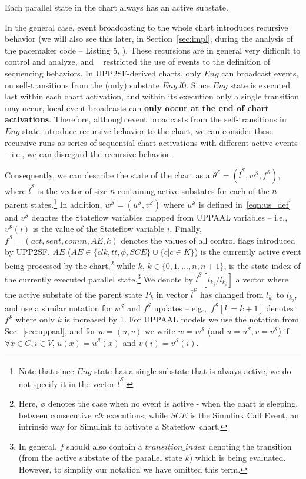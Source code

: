 \begin{proposition}
\label{p1_noinactivechild}
Each parallel state in the chart always has an active substate.
\end{proposition}

In the general case, event broadcasting to the whole chart introduces recursive behavior (we will also see this later, in Section~\ref{sec:impl}, during the analysis of the pacemaker code -- Listing 5, ). These recursions are in general very difficult to control and analyze, and ~\cite{SFsem1} restricted the use of events to the definition of sequencing behaviors. 
In UPP2SF-derived charts, only $Eng$ can broadcast events, on self-transitions from the (only) substate $Eng.l0$. Since $Eng$ state is executed last within each chart activation, and within its execution only a single transition may occur, local event broadcasts can \textbf{only occur at the end of chart activations}. Therefore, although event broadcasts from the self-transitions in $Eng$ state introduce recursive behavior to the chart, we can consider these recursive runs as series of sequential chart activations with different active events -- i.e., we can disregard the recursive behavior. 


Consequently, we can describe the state of the chart as a $\theta^\mathcal{S}=(\bar{l}^\mathcal{S},w^\mathcal{S},f^\mathcal{S})$, where $\bar{l}^\mathcal{S}$ is the vector of size $n$ containing active substates for each of the $n$ parent states.\footnote{Note that since $Eng$ state has a single substate that is always active, we do not specify it in the vector $\bar{l}^\mathcal{S}$.} 
In addition, $w^\mathcal{S}=(u^\mathcal{S},v^\mathcal{S})$ where $u^\mathcal{S}$ is defined in~\eqref{eqn:us_def} and $v^\mathcal{S}$ denotes the Stateflow variables mapped from UPPAAL variables -- i.e., $v^\mathcal{S}(i)$ is the value of the Stateflow variable $i$. Finally, $f^\mathcal{S}=(act,sent,comm,AE,k)$ denotes the values of all control flags introduced by UPP2SF. $AE$ ($AE\in\{clk,tt,\phi, SCE\}\cup\{c|c\in K\}$) is the currently active event being processed by the chart,\footnote{Here, $\phi$ denotes the case when no event is active - when the chart is sleeping, between consecutive 
\textit{clk} executions, while $SCE$ is the Simulink Call Event, an intrinsic way for Simulink to activate a Stateflow~chart.} while $k$, $k\in\{0,1,...,n,n+1\}$, is the state index of the currently executed parallel state.\footnote{In general, $f$ should also contain a $transition\_index$ denoting the transition (from the active substate of the parallel state $k$) which is being evaluated. However, to simplify our notation we have omitted this term.} 
We denote by $\bar{l}^\mathcal{S}[l_{k_j}/l_{k_i}]$ a vector where the active substate of the parent state $P_k$ in vector $\bar{l}^\mathcal{S}$ has changed from $l_{k_i}$ to $l_{k_j}$, and use a similar notation for $w^\mathcal{S}$ and $f^\mathcal{S}$ updates -- e.g.,~$f^\mathcal{S}[k=k+1]$ denotes $f^\mathcal{S}$ where only $k$ is increased by 1. 
For  UPPAAL models we use the notation from Sec.~\ref{sec:uppaal}, and for $w=(u,v)$ we write $w=w^{\mathcal{S}}$ (and $u=u^{\mathcal{S}},v=v^{\mathcal{S}}$) if $\forall x\in C, i\in V$, $u(x)=u^\mathcal{S}(x)$ and $v(i)=v^{\mathcal{S}}(i)$.


